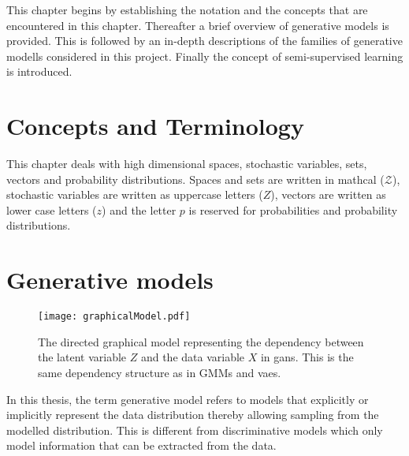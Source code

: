 This chapter begins by establishing the notation and the concepts that are encountered in this chapter. Thereafter a brief overview of generative models is provided. This is followed by an in-depth descriptions of the families of generative modells considered in this project. Finally the concept of semi-supervised learning is introduced.

\section{Concepts and Terminology}
This chapter deals with high dimensional spaces, stochastic variables, sets, vectors and probability distributions. Spaces and sets are written in mathcal ($\mathcal{Z}$), stochastic variables are written as uppercase letters ($Z$), vectors are written as lower case letters ($z$) and the letter $p$ is reserved for probabilities and probability distributions.

\section{Generative models}
\begin{figure}[t]
    \centering
    \texttt{[image: graphicalModel.pdf]}
    \caption{The directed graphical model representing the dependency between the latent variable $Z$ and the data variable $X$ in \acrshort{gans}. This is the same dependency structure as in GMMs and \acrshort{vaes}.}
    \label{fig:GANgraph}
\end{figure}
In this thesis, the term generative model refers to models that explicitly or implicitly represent the data distribution thereby allowing sampling from the modelled distribution. This is different from discriminative models which only model information that can be extracted from the data. 

